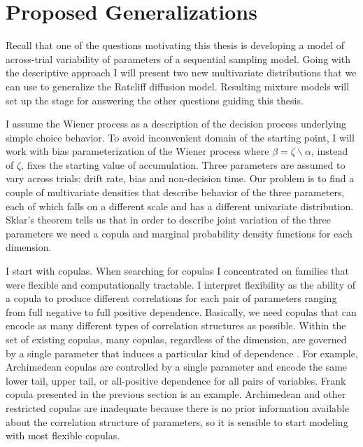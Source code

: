 \documentclass[12pt]{report}
\begin{document}
\section{Proposed Generalizations}

Recall that one of the questions motivating this thesis is developing a model of across-trial variability of parameters of a sequential sampling model. Going with the descriptive approach I will present two new multivariate distributions that we can use to generalize the Ratcliff diffusion model. Resulting mixture models will set up the stage for answering the other questions guiding this thesis.

I assume the Wiener process as a description of the decision process underlying simple choice behavior. To avoid inconvenient domain of the starting point, I will work
with bias parameterization of the Wiener process where $\beta = \zeta \backslash \alpha$, instead of $\zeta$, fixes the starting value of accumulation. Three parameters are assumed to vary across trials: drift rate, bias and non-decision time. Our problem is to find a couple of multivariate densities that describe behavior of the three parameters, each of which falls on a different scale and has a different univariate distribution. Sklar's theorem tells us that in order to describe joint variation of the three parameters we need a copula and marginal probability density functions for each dimension.
    
I start with copulas. When searching for copulas I concentrated on families that were flexible and computationally tractable. I interpret flexibility as
the ability of a copula to produce different correlations
for each pair of parameters ranging from full negative to full positive dependence.
Basically, we need copulas that can encode as many different types of
correlation structures as possible. Within the set of existing copulas, many
copulas, regardless of the dimension, are governed by a single
parameter that induces a particular kind of dependence
\citep{Joe1997,Nel2007}. For example, Archimedean copulas are
controlled by a single parameter and encode the same lower tail,
upper tail, or all-positive dependence for all
pairs of variables. Frank copula presented in the previous section is an example. Archimedean and other restricted copulas are inadequate because there is no prior information
available about the correlation structure of parameters, so it is sensible to start modeling with most flexible copulas.
    
\end{document}
